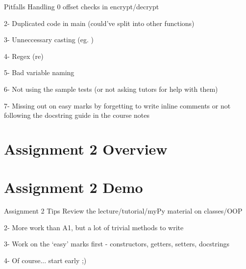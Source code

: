\documentclass[week2]{csse1001}
\begin{document}
\begin{topic}{Pitfalls}
Handling 0 offset checks in encrypt/decrypt

\begin{subtopic}{2-}
Duplicated code in main (could've split into other functions)
\end{subtopic}

\begin{subtopic}{3-}
Unneccessary casting (eg. )
\end{subtopic}

\begin{subtopic}{4-}
Regex (re)
\end{subtopic}

\begin{subtopic}{5-}
Bad variable naming
\end{subtopic}

\begin{subtopic}{6-}
Not using the sample tests (or not asking tutors for help with them)
\end{subtopic}

\begin{subtopic}{7-}
Missing out on easy marks by forgetting to write inline comments or not following the docstring guide in the course notes
\end{subtopic}

\end{topic}

\section{Assignment 2 Overview}

\section{Assignment 2 Demo}

\begin{topic}{Assignment 2 Tips}
Review the lecture/tutorial/myPy material on classes/OOP

\begin{subtopic}{2-}
More work than A1, but a lot of trivial methods to write
\end{subtopic}

\begin{subtopic}{3-}
Work on the `easy' marks first - constructors, getters, setters, docstrings
\end{subtopic}

\begin{subtopic}{4-}
Of course... start early ;)
\end{subtopic}
\end{topic}
\end{document}
